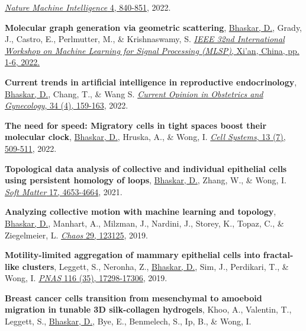 \documentclass[margin,line]{res}
\begin{document}
\begin{resume}
{\begin{etaremune}[start=15]
\href{https://doi.org/10.1039/D1SM00072A}{\textit{Nature Machine Intelligence} 4, 840-851}, 2022.
\vspace*{.1cm}
\item{\bf Molecular graph generation via geometric scattering},
\underline{Bhaskar, D.}, Grady, J., Castro, E., Perlmutter, M., \& Krishnaswamy, S.
\href{https://doi.org/10.1109/MLSP55214.2022.9943379}{\textit{IEEE 32nd International Workshop on Machine Learning for Signal Processing (MLSP)}, Xi'an, China, pp. 1-6, 2022.}
\vspace*{.1cm}
\item{\bf Current trends in artificial intelligence in reproductive endocrinology},
\underline{Bhaskar, D.}, Chang, T., \& Wang S.
\href{https://doi.org/10.1097/GCO.0000000000000796}{\textit{Current Opinion in Obstetrics and Gynecology}, 34 (4), 159-163}, 2022.
\vspace*{.1cm}
\item{\bf The need for speed: Migratory cells in tight spaces boost their molecular clock},
\underline{Bhaskar, D.}, Hruska, A., \& Wong, I.
\href{https://doi.org/10.1016/j.cels.2022.06.002}{\textit{Cell Systems}, 13 (7), 509-511}, 2022.
\vspace*{.1cm}
\item{\bf Topological data analysis of collective and individual epithelial cells using persistent homology of loops}, 
\underline{Bhaskar, D.}, Zhang, W., \& Wong, I. 
\href{https://doi.org/10.1039/D1SM00072A}{\textit{Soft Matter} 17, 4653-4664}, 2021.
\vspace*{.1cm}
\item{\bf Analyzing collective motion with machine learning and topology}, 
\underline{Bhaskar, D.}, Manhart, A., Milzman, J., Nardini, J., Storey, K., Topaz, C., \& Ziegelmeier, L. 
\href{https://aip.scitation.org/doi/10.1063/1.5125493}{\textit{Chaos} 29, 123125}, 2019.
\vspace*{.1cm}
\item{\bf Motility-limited aggregation of mammary epithelial cells into fractal-like clusters}, 
Leggett, S., Neronha, Z., \underline{Bhaskar, D.}, Sim, J., Perdikari, T., \& Wong, I. 
\href{https://www.pnas.org/content/116/35/17298.short}{\textit{PNAS} 116 (35), 17298-17306}, 2019.
\item{\bf Breast cancer cells transition from mesenchymal to amoeboid migration in tunable 3D silk-collagen hydrogels},
Khoo, A., Valentin, T., Leggett, S., \underline{Bhaskar, D.}, Bye, E., Benmelech, S., Ip, B., \& Wong, I. 

\end{etaremune}}
\end{resume}
\end{document}
